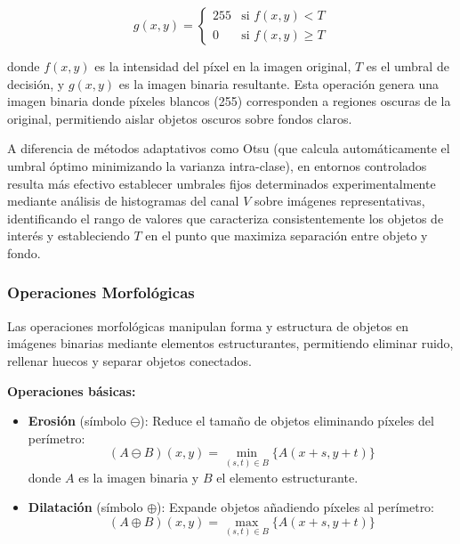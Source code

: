\begin{equation}
g(x,y) = \begin{cases}
255 & \text{si } f(x,y) < T \\
0 & \text{si } f(x,y) \geq T
\end{cases}
\end{equation}

donde $f(x,y)$ es la intensidad del píxel en la imagen original, $T$ es el umbral de decisión, y $g(x,y)$ es la imagen binaria resultante. Esta operación genera una imagen binaria donde píxeles blancos (255) corresponden a regiones oscuras de la original, permitiendo aislar objetos oscuros sobre fondos claros.

A diferencia de métodos adaptativos como Otsu (que calcula automáticamente el umbral óptimo minimizando la varianza intra-clase), en entornos controlados resulta más efectivo establecer umbrales fijos determinados experimentalmente mediante análisis de histogramas del canal $V$ sobre imágenes representativas, identificando el rango de valores que caracteriza consistentemente los objetos de interés y estableciendo $T$ en el punto que maximiza separación entre objeto y fondo.

\subsubsection{Operaciones Morfológicas}

Las operaciones morfológicas manipulan forma y estructura de objetos en imágenes binarias mediante elementos estructurantes, permitiendo eliminar ruido, rellenar huecos y separar objetos conectados.

\textbf{Operaciones básicas:}

\begin{itemize}
\item \textbf{Erosión} (símbolo $\ominus$): Reduce el tamaño de objetos eliminando píxeles del perímetro:
\begin{equation}
(A \ominus B)(x,y) = \min_{(s,t) \in B} \{A(x+s, y+t)\}
\end{equation}
donde $A$ es la imagen binaria y $B$ el elemento estructurante.

\item \textbf{Dilatación} (símbolo $\oplus$): Expande objetos añadiendo píxeles al perímetro:
\begin{equation}
(A \oplus B)(x,y) = \max_{(s,t) \in B} \{A(x+s, y+t)\}
\end{equation}
\end{itemize}

